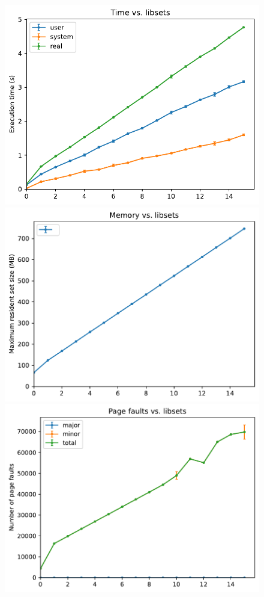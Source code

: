 \begin{figure}
\begin{minipage}{0.5\textwidth}
	\label{fig:libgotcha:deno}
	\end{minipage}
%
	\begin{minipage}{0.5\textwidth}
	\includegraphics[width=\textwidth]{figs/dyno-times}
	\includegraphics[width=\textwidth]{figs/dyno-memory}
	\includegraphics[width=\textwidth]{figs/dyno-faults}

\end{minipage}
\end{figure}
